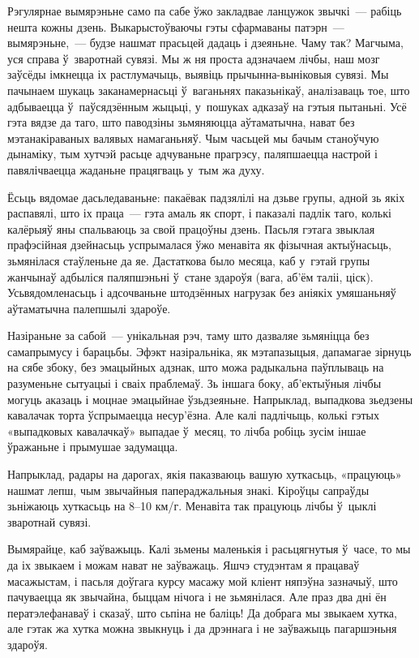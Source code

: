 Рэгулярнае вымярэньне само па сабе ўжо закладвае ланцужок звычкі~--- рабіць нешта кожны дзень. Выкарыстоўваючы гэты сфармаваны патэрн~--- вымярэньне,~--- будзе нашмат прасьцей дадаць і дзеяньне. Чаму так? Магчыма, уся справа ў~зваротнай сувязі. Мы ж ня проста адзначаем лічбы, наш мозг заўсёды імкнецца іх растлумачыць, выявіць прычынна-выніковыя сувязі. Мы пачынаем шукаць заканамернасьці ў~ваганьнях паказьнікаў, аналізаваць тое, што адбываецца ў~паўсядзённым жыцьці, у~пошуках адказаў на гэтыя пытаньні. Усё гэта вядзе да таго, што паводзіны зьмяняюцца аўтаматычна, нават без мэтанакіраваных валявых намаганьняў. Чым часьцей мы бачым станоўчую дынаміку, тым хутчэй расьце адчуваньне прагрэсу, паляпшаецца настрой і павялічваецца жаданьне працягваць у~тым жа духу.

Ёсьць вядомае дасьледаваньне: пакаёвак падзялілі на дзьве групы, адной зь якіх распавялі, што іх праца~--- гэта амаль як спорт, і паказалі падлік таго, колькі калёрыяў яны спальваюць за свой працоўны дзень. Пасьля гэтага звыклая прафэсійная дзейнасьць успрымалася ўжо менавіта як фізычная актыўнасьць, зьмянілася стаўленьне да яе. Дастаткова было месяца, каб у~гэтай групы жанчынаў адбыліся паляпшэньні ў~стане здароўя (вага, аб'ём таліі, ціск). Усьвядомленасьць і адсочваньне штодзённых нагрузак без аніякіх умяшаньняў аўтаматычна палепшылі здароўе.

Назіраньне за сабой~--- унікальная рэч, таму што дазваляе зьмяніцца без самапрымусу і барацьбы. Эфэкт назіральніка, як мэтапазыцыя, дапамагае зірнуць на сябе збоку, без эмацыйных адзнак, што можа радыкальна паўплываць на разуменьне сытуацыі і сваіх праблемаў. Зь іншага боку, аб'ектыўныя лічбы могуць аказаць і моцнае эмацыйнае ўзьдзеяньне. Напрыклад, выпадкова зьедзены кавалачак торта ўспрымаецца несур'ёзна. Але калі падлічыць, колькі гэтых «выпадковых кавалачкаў» выпадае ў~месяц, то лічба робіць зусім іншае ўражаньне і прымушае задумацца.

Напрыклад, радары на дарогах, якія паказваюць вашую хуткасьць, «працуюць» нашмат лепш, чым звычайныя папераджальныя знакі. Кіроўцы сапраўды зьніжаюць хуткасьць на 8--10 км/г. Менавіта так працуюць лічбы ў~цыклі зваротнай сувязі.

Вымярайце, каб заўважыць. Калі зьмены маленькія і расьцягнутыя ў~часе, то мы да іх звыкаем і можам нават не заўважаць. Яшчэ студэнтам я працаваў масажыстам, і пасьля доўгага курсу масажу мой кліент няпэўна зазначыў, што пачуваецца як звычайна, быццам нічога і не зьмянілася. Але праз два дні ён ператэлефанаваў і сказаў, што сьпіна не баліць! Да добрага мы звыкаем хутка, але гэтак жа хутка можна звыкнуць і да дрэннага і не заўважыць пагаршэньня здароўя.

